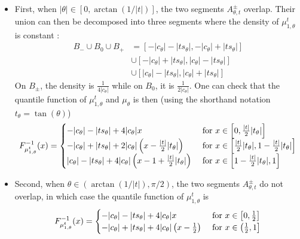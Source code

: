     \begin{itemize}
        \item First, when $|\theta| \in [0,\arctan(1/|t|)]$,  the two segments $A^\pm_{\theta,t}$ overlap. Their union can then be decomposed into three segments where the density of $\mu_{1,\theta}^t$ is constant :
        \begin{align} 
        B_- \cup B_0 \cup B_+ &= [-|c_\theta| - |t s_\theta|, -|c_\theta| + |t s_\theta|] \\
        &\cup [-|c_\theta| + |t s_\theta|, |c_\theta| - |t s_\theta|] \\
        &\cup [|c_\theta| - |t s_\theta|, |c_\theta| + |t s_\theta|]
        \end{align}
        On $B_\pm$, the density is $\frac{1}{4|c_\theta|}$ while on $B_0$, it is $\frac{1}{2|c_\theta|}$. One can check that the quantile function of $\mu^t_{1,\theta}$ and $\mu_\theta$ is then (using the shorthand notation $t_\theta = \tan(\theta)$)
        \begin{equation} F^{-1}_{\mu^t_{1,\theta}}(x) = 
        \begin{cases} 
        -|c_\theta| - |t s_\theta| + 4 |c_\theta| x 
        & \hbox{ for } x\in \left[0, \frac{|t|}{2}|t_\theta|\right]\\
        -|c_\theta| + |t s_\theta| + 2 |c_\theta|\left(x -  \frac{|t|}{2}|t_\theta|\right)
        & \hbox{ for } x\in \left[\frac{|t|}{2}|t_\theta|, 1-\frac{|t|}{2}|t_\theta|\right]\\
        |c_\theta| - |t s_\theta| + 4|c_\theta|\left(x - 1 + \frac{|t|}{2}|t_\theta|\right)
        & \hbox{ for } x\in \left[1-\frac{|t|}{2}|t_\theta|, 1\right]\\
        \end{cases} \end{equation}
        \item Second, when $\theta \in (\arctan(1/|t|), \pi/2)$, the two segments $A^\pm_{\theta,t}$ do not overlap, in which case the quantile function of $\mu^t_{1,\theta}$ is 
        \begin{equation} F^{-1}_{\mu^t_{1,\theta}}(x) = 
        \begin{cases} 
        -|c_\theta| - |t s_\theta| + 4 |c_\theta| x 
        & \hbox{ for } x\in \left[0, \frac{1}{2}\right]\\
        -|c_\theta| + |t s_\theta| + 4|c_\theta|\left(x - \frac{1}{2}\right)
        & \hbox{ for } x\in \left(\frac{1}{2},1\right]\\
        \end{cases} \end{equation}
    \end{itemize}

